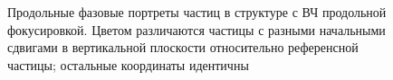 \begin{figure}[H]\centering
	\caption{Продольные фазовые портреты частиц в структуре с ВЧ продольной фокусировкой. Цветом различаются частицы с разными начальными сдвигами в вертикальной плоскости относительно референсной частицы; остальные координаты идентичны}
\end{figure}

